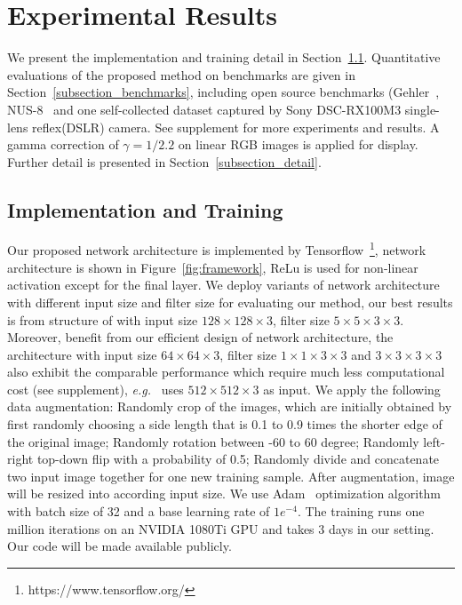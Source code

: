 \documentclass[10pt,twocolumn,letterpaper]{article}
\begin{document}
\section{Experimental Results}
\label{section_experiments}
We present the implementation and training detail in Section~\ref{subsection_impl_train}.
Quantitative evaluations of the proposed method on benchmarks are given in Section~\ref{subsection_benchmarks},
including open source benchmarks (Gehler~\cite{gehler2008bayesian},
NUS-8~\cite{cheng2014illuminant}
and one self-collected dataset captured by Sony DSC-RX100M3 single-lens reflex(DSLR) camera.
See supplement for more experiments and results.
A gamma correction of $\gamma = 1/2.2$ on linear RGB images is applied for display.
Further detail is presented in Section~\ref{subsection_detail}.

\subsection{Implementation and Training}
\label{subsection_impl_train}
Our proposed network architecture is implemented by Tensorflow~\footnote{https://www.tensorflow.org/},
network architecture is shown in Figure~\ref{fig:framework},
ReLu is used for non-linear activation except for the final layer.
We deploy variants of network architecture with different input size and filter size
for evaluating our method, our best results is from structure of
with input size $128\times128\times3$, filter size $5\times5\times3\times3$.
Moreover, benefit from our efficient design of network architecture,
the architecture with input size $64\times64\times3$, filter size $1\times1\times3\times3$ and $3\times3\times3\times3$ also
exhibit the comparable performance which require much less computational cost (see supplement),
\textit{e.g.}~\cite{hu2017fc} uses $512\times512\times3$ as input.
We apply the following data augmentation:
Randomly crop of the images, which are initially obtained by
first randomly choosing a side length that is 0.1 to 0.9 times the shorter edge of the original image;
Randomly rotation between -60 to 60 degree;
Randomly left-right top-down flip with a probability of 0.5;
Randomly divide and concatenate two input image together for one new training sample.
After augmentation, image will be resized into according input size.
We use Adam~\cite{kingma2014adam} optimization algorithm with batch size of 32 and a base learning rate of $1e^{-4}$.
The training runs one million iterations on an NVIDIA 1080Ti GPU and takes 3 days in our setting.
Our code will be made available publicly.
\end{document}
